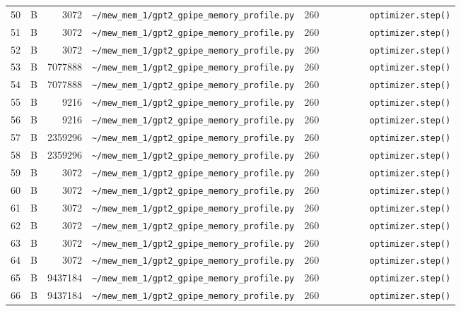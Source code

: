 \documentclass{article}
\begin{document}
\begin{longtable}{r l r p{6.5cm} r p{7.0cm}}
50 & B & 3072 & \lstinline|~/mew_mem_1/gpt2_gpipe_memory_profile.py| & 260 & \lstinline|        optimizer.step()| \\
51 & B & 3072 & \lstinline|~/mew_mem_1/gpt2_gpipe_memory_profile.py| & 260 & \lstinline|        optimizer.step()| \\
52 & B & 3072 & \lstinline|~/mew_mem_1/gpt2_gpipe_memory_profile.py| & 260 & \lstinline|        optimizer.step()| \\
53 & B & 7077888 & \lstinline|~/mew_mem_1/gpt2_gpipe_memory_profile.py| & 260 & \lstinline|        optimizer.step()| \\
54 & B & 7077888 & \lstinline|~/mew_mem_1/gpt2_gpipe_memory_profile.py| & 260 & \lstinline|        optimizer.step()| \\
55 & B & 9216 & \lstinline|~/mew_mem_1/gpt2_gpipe_memory_profile.py| & 260 & \lstinline|        optimizer.step()| \\
56 & B & 9216 & \lstinline|~/mew_mem_1/gpt2_gpipe_memory_profile.py| & 260 & \lstinline|        optimizer.step()| \\
57 & B & 2359296 & \lstinline|~/mew_mem_1/gpt2_gpipe_memory_profile.py| & 260 & \lstinline|        optimizer.step()| \\
58 & B & 2359296 & \lstinline|~/mew_mem_1/gpt2_gpipe_memory_profile.py| & 260 & \lstinline|        optimizer.step()| \\
59 & B & 3072 & \lstinline|~/mew_mem_1/gpt2_gpipe_memory_profile.py| & 260 & \lstinline|        optimizer.step()| \\
60 & B & 3072 & \lstinline|~/mew_mem_1/gpt2_gpipe_memory_profile.py| & 260 & \lstinline|        optimizer.step()| \\
61 & B & 3072 & \lstinline|~/mew_mem_1/gpt2_gpipe_memory_profile.py| & 260 & \lstinline|        optimizer.step()| \\
62 & B & 3072 & \lstinline|~/mew_mem_1/gpt2_gpipe_memory_profile.py| & 260 & \lstinline|        optimizer.step()| \\
63 & B & 3072 & \lstinline|~/mew_mem_1/gpt2_gpipe_memory_profile.py| & 260 & \lstinline|        optimizer.step()| \\
64 & B & 3072 & \lstinline|~/mew_mem_1/gpt2_gpipe_memory_profile.py| & 260 & \lstinline|        optimizer.step()| \\
65 & B & 9437184 & \lstinline|~/mew_mem_1/gpt2_gpipe_memory_profile.py| & 260 & \lstinline|        optimizer.step()| \\
66 & B & 9437184 & \lstinline|~/mew_mem_1/gpt2_gpipe_memory_profile.py| & 260 & \lstinline|        optimizer.step()| \\

\end{longtable}
\end{document}
